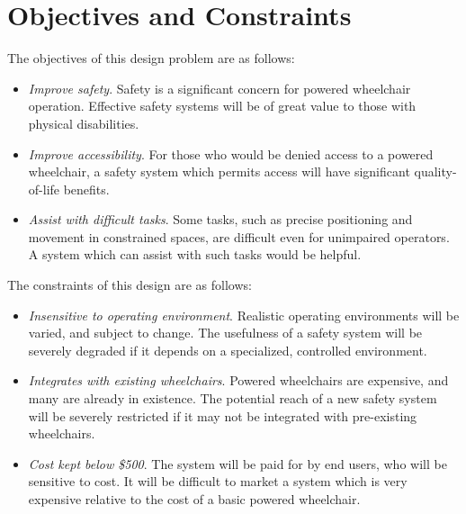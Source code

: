 \documentclass[oneside,final,a4paper]{report}
\begin{document}
\section{Objectives and Constraints}
The objectives of this design problem are as follows:

\begin{itemize}
 \item \emph{Improve safety}.  Safety is a significant concern for powered wheelchair operation.  Effective safety systems will be of great value to those with physical disabilities.
 \item \emph{Improve accessibility}.  For those who would be denied access to a powered wheelchair, a safety system which permits access will have significant quality-of-life benefits.
 \item \emph{Assist with difficult tasks}. Some tasks, such as precise positioning and movement in constrained spaces, are difficult even for unimpaired operators.   A system which can assist with such tasks would be helpful.
\end{itemize}

The constraints of this design are as follows:

\begin{itemize}
 \item \emph{Insensitive to operating environment}.  Realistic operating environments will be varied, and subject to change.  The usefulness of a safety system will be severely degraded if it depends on a specialized, controlled environment.
 \item \emph{Integrates with existing wheelchairs}.  Powered wheelchairs are expensive, and many are already in existence.  The potential reach of a new safety system will be severely restricted if it may not be integrated with pre-existing wheelchairs.
 \item \emph{Cost kept below \$500}.  The system will be paid for by end users, who will be sensitive to cost.  It will be difficult to market a system which is very expensive relative to the cost of a basic powered wheelchair.
\end{itemize}
\end{document}
